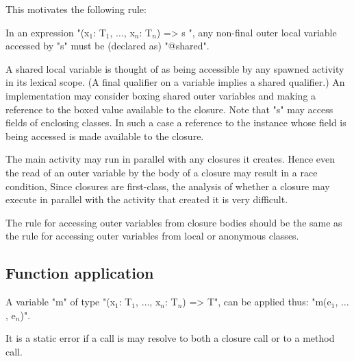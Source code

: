 This motivates the following rule:

\begin{staticrule*}
In an expression
\xcdmath"(x$_1$: T$_1$, $\dots$, x$_n$: T$_n$) => { s }",
any non-final outer local variable accessed by \xcd"s" must be (declared
as) \xcd"@shared".
\end{staticrule*}

A shared local variable is thought of as being accessible by any spawned
activity in its lexical scope. (A final qualifier on a variable implies
a shared qualifier.) An implementation may consider boxing shared outer
variables and making a reference to the boxed value available to the
closure. Note that \xcd"s" may access fields of enclosing classes. In such a
case a reference to the instance whose field is being accessed is made
available to the closure.

\begin{note}
The main activity may run in parallel with any
closures it creates. Hence even the read of an outer variable by the
body of a closure may result in a race condition, Since closures are
first-class, the analysis of whether a closure may execute in parallel
with the activity that created it is very difficult.
\end{note}

\begin{note}
The rule for accessing outer variables from closure bodies
should be the same as the rule for accessing outer variables from local
or anonymous classes.
\end{note}

\subsection{ Function application}

A variable \xcd"m" of type
\xcdmath"(x$_1$: T$_1$, $\dots$, x$_n$: T$_n$) => T",
can be applied thus:
\xcdmath"m(e$_1$, $\dots$, e$_n$)".

It is a static error if a call is may resolve to both a closure call or
to a method call.


